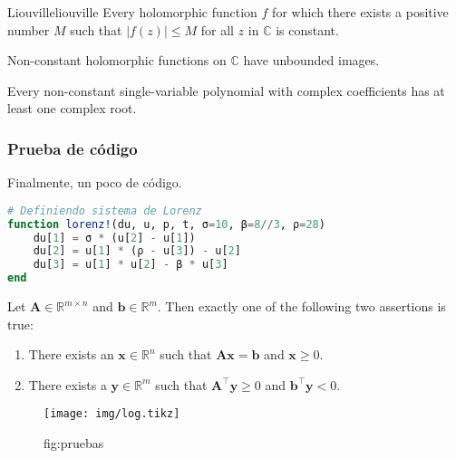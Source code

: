 \documentclass[colorful]{sty/itam-thesis}
\begin{document}
\lipsum[2][2]

\begin{thrm}{Liouville}{liouville}
	Every holomorphic function $f$ for which there exists a positive 
	number $M$ such that $|f(z)| \leq M$ for all $z$ in $\mathbb{C}$
	is constant.
\end{thrm}


\begin{coro}{}{}
	Non-constant holomorphic functions on $\mathbb{C}$  have unbounded 
	images.
\end{coro}

\begin{lemma}{}{}
	Every non-constant single-variable polynomial with complex 
	coefficients has at least one complex root.
\end{lemma}

\subsubsection{Prueba de código}
Finalmente, un poco de código.

\begin{lstlisting}[language=julia, caption=Aplicando algoritmo de cifrado]
# Definiendo sistema de Lorenz
function lorenz!(du, u, p, t, σ=10, β=8//3, ρ=28)
    du[1] = σ * (u[2] - u[1])
    du[2] = u[1] * (ρ - u[3]) - u[2]
    du[3] = u[1] * u[2] - β * u[3]
end
\end{lstlisting}

\lipsum[3][1-3]

\begin{lemma}{}{}
	Let $\displaystyle \mathbf{A} \in \mathbb{R}^{m\times n}$ and 
	$\displaystyle \mathbf{b} \in \mathbb {R}^{m}$. Then exactly one 
	of the following two assertions is true:
	\begin{enumerate}
		\item There exists an $\displaystyle \mathbf{x} \in \mathbb 
			{R} ^{n}$ such that $\mathbf{Ax} =\mathbf{b}$ and 
			$\displaystyle \mathbf{x} \geq 0$.
		\item There exists a $\displaystyle \mathbf{y} \in \mathbb
			{R}^{m}$ such that $\displaystyle 
			\mathbf{A}^{\top}\mathbf{y} \geq 0$ and $\displaystyle 
			\mathbf{b}^{\top}\mathbf{y} <0$.
	\end{enumerate}
\end{lemma}

\begin{algorithm}
    \caption[Tree prediction algorithm]{Predict output value $\widehat{y}$ with
        tree $f_\L$ \cite[Ch.~3.2]{louppe2014}.}
    \label{alg:tree-predict}
\end{algorithm}

\begin{figure}
\centering
\texttt{[image: img/log.tikz]}
\caption{fig:pruebas}
\end{figure}

\printbibliography
\end{document}
